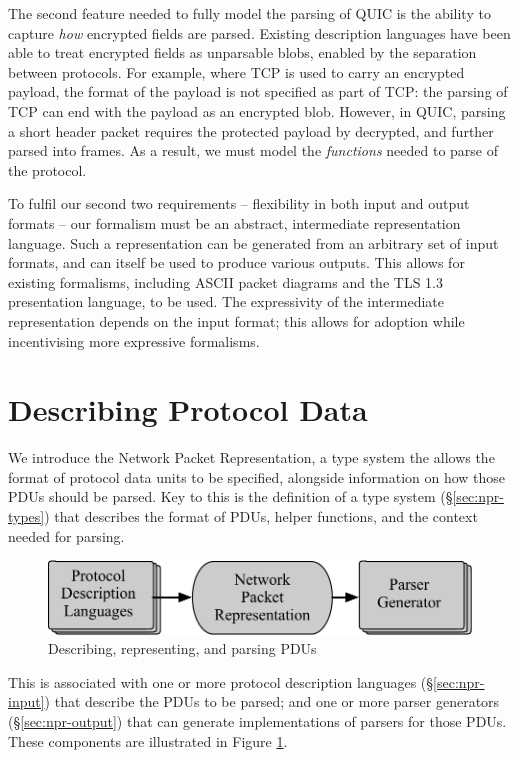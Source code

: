 \documentclass[10pt,sigconf]{acmart}
\begin{document}
The second feature needed to fully model the parsing of QUIC is the ability to capture
\emph{how} encrypted fields are parsed. Existing description
languages have been able to treat encrypted fields as unparsable blobs, enabled by the
separation between protocols. For example, where TCP is used to carry an encrypted
payload, the format of the payload is not specified as part of TCP: the parsing of TCP can
end with the payload as an encrypted blob. However, in QUIC, parsing a short header packet
requires the protected payload by decrypted, and further parsed into frames. As a
result, we must model the \emph{functions} needed to parse of the protocol.

To fulfil our second two requirements -- flexibility in both input and output formats --
our formalism must be an abstract, intermediate representation language. Such a
representation can be generated from an arbitrary set of input formats, and can itself be
used to produce various outputs. This allows for existing formalisms, including ASCII
packet diagrams and the TLS 1.3 presentation language, to be used. The expressivity
of the intermediate representation depends on the input format; this allows for adoption
while incentivising more expressive formalisms.

\section{Describing Protocol Data}
\label{sec:npr}

We introduce the Network Packet Representation, a type system the allows
the format of protocol data units to be specified, alongside information
on how those PDUs should be parsed.
Key to this is the definition of a type system (\S\ref{sec:npr-types}) that
describes the format of PDUs, helper functions, and the context needed for
parsing.

\begin{figure}
  \includegraphics[width=0.7\linewidth]{figures/architecture-flow.pdf}
  \caption{Describing, representing, and parsing PDUs}
  \label{fig:stages}
\end{figure}

This is associated with one or more protocol description languages
(\S\ref{sec:npr-input}) that describe the PDUs to be parsed; and one
or more parser generators (\S\ref{sec:npr-output}) that can generate
implementations of parsers for those PDUs.
These components are illustrated in Figure \ref{fig:stages}.
\end{document}
